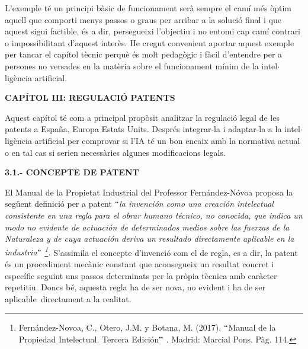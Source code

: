 \documentclass[12pt]{article}
\begin{document}
\vspace{\baselineskip}

\vspace{\baselineskip}
\begin{justify}
L’exemple té un principi bàsic de funcionament serà sempre el camí més òptim aquell que comporti menys passos o graus per arribar a la solució final i que aquest sigui factible, és a dir, persegueixi l’objectiu i no entomi cap camí contrari o impossibilitant d’aquest interès. He cregut convenient aportar aquest exemple per tancar el capítol tècnic perquè és molt pedagògic i fàcil d’entendre per a persones no versades en la matèria sobre el funcionament mínim de la intel$ \cdot $ ligència artificial.
\end{justify}\par

\begin{Center}
{\fontsize{16pt}{19.2pt}\selectfont \textbf{CAPÍTOL III: REGULACIÓ PATENTS}\par}
\end{Center}\par


\vspace{\baselineskip}
\begin{justify}
Aquest capítol té com a principal propòsit analitzar la regulació legal de les patents a España, Europa Estats Units. Després integrar-la i adaptar-la a la intel$ \cdot $ ligència artificial per comprovar si l’IA té un bon encaix amb la normativa actual o en tal cas si serien necessàries algunes modificacions legals. 
\end{justify}\par


\vspace{\baselineskip}
\begin{justify}
\textbf{3.1.- CONCEPTE DE PATENT}
\end{justify}\par


\vspace{\baselineskip}
\begin{justify}
El Manual de la Propietat Industrial del Professor Fernández-Nóvoa proposa la següent definició per a patent $``$\textit{la invención como una creación intelectual consistente en una regla para el obrar humano técnico, no conocida, que indica un modo no evidente de actuación de determinados medios sobre las fuerzas de la Naturaleza y de cuya actuación deriva un resultado directamente aplicable en la industria$"$ \footnote{ Fernández-Novoa, C., Otero, J.M. y Botana, M. (2017). $``$Manual de la Propiedad Intelectual. Tercera Edición$"$ . Madrid: Marcial Pons. Pàg. 114. }. } S’assimila el concepte d’invenció com el de regla, es a dir, la patent és un procediment mecànic constant que aconsegueix un resultat concret i específic seguint uns passos determinats per la pròpia tècnica amb caràcter repetitiu. Doncs bé, aquesta regla ha de ser nova, no evident i ha de ser aplicable\ directament  a la realitat.  
\end{justify}\par
\end{document}
